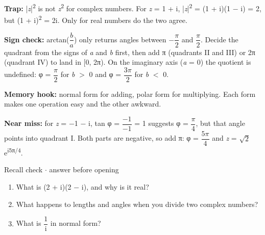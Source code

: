 \documentclass[11pt]{article}
\begin{document}
\begin{keepsection}
\begin{keepsection}
\begin{notebox}\textbf{Trap:} |\textit{z}|\textsuperscript{2} is not \textit{z}\textsuperscript{2} for complex numbers. For \textit{z} = 1 + i, |\textit{z}|\textsuperscript{2} = (1 + i)(1 \ensuremath{-} i) = 2, but (1 + i)\textsuperscript{2} = 2i. Only for real numbers do the two agree.\end{notebox}

\begin{notebox}\textbf{Sign check:} arctan({\small\ensuremath{\dfrac{{b}}{{a}}}}) only returns angles between \ensuremath{-}{\small\ensuremath{\dfrac{π}{2}}} and {\small\ensuremath{\dfrac{π}{2}}}. Decide the quadrant from the signs of \textit{a} and \textit{b} first, then add π (quadrants II and III) or 2π (quadrant IV) to land in [0, 2π). On the imaginary axis (\textit{a} = 0) the quotient is undefined: φ = {\small\ensuremath{\dfrac{π}{2}}} for \textit{b} \ensuremath{>} 0 and φ = {\small\ensuremath{\dfrac{3π}{2}}} for \textit{b} \ensuremath{<} 0.\end{notebox}

\begin{notebox}\textbf{Memory hook:} normal form for adding, polar form for multiplying. Each form makes one operation easy and the other awkward.\end{notebox}

\begin{notebox}\textbf{Near miss:} for \textit{z} = \ensuremath{-}1 \ensuremath{-} i, tan φ = {\small\ensuremath{\dfrac{-1}{-1}}} = 1 suggests φ = {\small\ensuremath{\dfrac{π}{4}}}, but that angle points into quadrant I. Both parts are negative, so add π: φ = {\small\ensuremath{\dfrac{5π}{4}}} and \textit{z} = \ensuremath{\sqrt{2}}e\textsuperscript{i5π/4}.\end{notebox}

\begin{recallbox}{Recall check \ensuremath{\cdot} answer before opening}
\begin{enumerate}
\item What is (2 + i)(2 \ensuremath{-} i), and why is it real?
\item What happens to lengths and angles when you divide two complex numbers?
\item What is {\small\ensuremath{\dfrac{1}{\mathrm{i}}}} in normal form?
\end{enumerate}

\end{recallbox}
\end{keepsection}
\end{keepsection}
\end{document}
